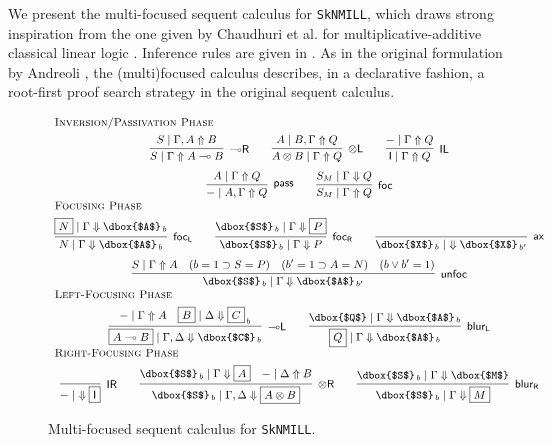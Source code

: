 \documentclass[runningheads]{llncs}
\newcommand{\tl}{\otimes \mathsf{L}}
\newcommand{\tr}{\otimes \mathsf{R}}
\newcommand{\lright}{{\multimap}\mathsf{R}}
\newcommand{\lleft}{{\multimap}\mathsf{L}}
\newcommand{\pass}{\mathsf{pass}}
\newcommand{\unitl}{\mathsf{IL}}
\newcommand{\unitr}{\mathsf{IR}}
\newcommand{\otL}{\tl}
\newcommand{\otR}{\tr}
\newcommand{\lolliR}{\lright}
\newcommand{\lolliL}{\lleft}
\newcommand{\IL}{\unitl}
\newcommand{\IR}{\unitr}
\newcommand{\ax}{\mathsf{ax}}
\newcommand{\ot}{\otimes}
\newcommand{\lolli}{\multimap}
\newcommand{\I}{\mathsf{I}}
\newcommand{\SkNMILL}{\texttt{SkNMILL}}
\newcommand{\up}{\Uparrow}
\newcommand{\dn}{\Downarrow}
\newcommand{\focL}{\mathsf{foc_L}}
\newcommand{\foc}{\mathsf{foc}}
\newcommand{\focR}{\mathsf{foc_R}}
\newcommand{\blurL}{\mathsf{blur_L}}
\newcommand{\blurR}{\mathsf{blur_R}}
\newcommand{\unfoc}{\mathsf{unfoc}}
\begin{document}
We present the multi-focused sequent calculus for \SkNMILL, which draws strong inspiration from   the one given by Chaudhuri et al. for multiplicative-additive classical linear logic \cite{chaudhuri:canonical:2008}. Inference rules are given in . As in the original formulation by Andreoli \cite{andreoli:logic:1992}, the (multi)focused calculus describes, in a declarative fashion, a root-first proof search strategy in the original sequent calculus.
\begin{figure}[t]
  \[
  \small
  \begin{array}{c}
    \multicolumn{1}{l}{\text{\textsc{Inversion/Passivation Phase}}} \\[4pt]
      \infer[\lolliR]{S \mid \Gamma \up A \lolli B}{S \mid \Gamma , A \up B}
    \qquad
    \infer[\otL]{A \ot B \mid \Gamma \up Q}{A \mid  B , \Gamma \up Q}
    \qquad
      \infer[\IL]{\I \mid \Gamma \up Q}{- \mid \Gamma \up Q}    
    \\[6pt]    
    \infer[\pass]{- \mid A , \Gamma \up Q}{
      A\mid \Gamma \up Q
    }
    \qquad
        \infer[\foc]{S_M \mid \Gamma \up Q}{
      S_M \mid \Gamma \dn Q
    }
    \\
    \multicolumn{1}{l}{\text{\textsc{Focusing Phase}}} \\[4pt]
        \infer[\focL]{N \mid \Gamma \dn \dbox{$A$}_{\, b}}{
      \fbox{$N$} \mid \Gamma \dn \dbox{$A$}_{\, b}
        }
    \qquad
    \infer[\focR]{\dbox{$S$}_{\, b} \mid \Gamma \dn P}{
      \dbox{$S$}_{\, b} \mid \Gamma \dn \fbox{$P$}
    }
    \qquad
        \infer[\ax]{\dbox{$X$}_{\, b} \mid ~ \dn \dbox{$X$}_{\, b'}}{}
    \\[6pt]
    \infer[\unfoc]{\dbox{$S$}_{\,b} \mid \Gamma \dn \dbox{$A$}_{\,b'}}{
      S \mid \Gamma \up A
      &
      (b = 1 \supset S = P)
      &
      (b' = 1 \supset A = N)
      &
      (b \vee b' = 1)
    }
    \\
    \multicolumn{1}{l}{\text{\textsc{Left-Focusing Phase}}} \\[4pt]
    \infer[\lolliL]{\fbox{$A \lolli B$} \mid \Gamma , \Delta \dn \dbox{$C$}_{\,b}}{
      - \mid \Gamma \up A
      &
      \fbox{$B$} \mid \Delta \dn \fbox{$C$}_{\,b}
    }
    \qquad
        \infer[\blurL]{\fbox{$Q$} \mid \Gamma \dn \dbox{$A$}_{\,b}}{
      \dbox{$Q$} \mid \Gamma \dn \dbox{$A$}_{\,b}
      }    
    \\        
    \multicolumn{1}{l}{\text{\textsc{Right-Focusing Phase}}} \\[4pt]
    \infer[\IR]{- \mid ~ \dn \fbox{$\I$}}{}
    \qquad
    \infer[\otR]{\dbox{$S$}_{\,b} \mid \Gamma , \Delta \dn \fbox{$A \ot B$}}{
      \dbox{$S$}_{\,b} \mid \Gamma \dn \fbox{$A$}
      &
      - \mid \Delta \up B
    }
    \qquad
        \infer[\blurR]{\dbox{$S$}_{\,b} \mid \Gamma \dn \fbox{$M$}}{
      \dbox{$S$}_{\,b} \mid \Gamma \dn \dbox{$M$}
    }
    \end{array}
  \]
  \caption{Multi-focused sequent calculus for \SkNMILL.} 
  \label{fig:multi-focus}
\end{figure}
\end{document}
